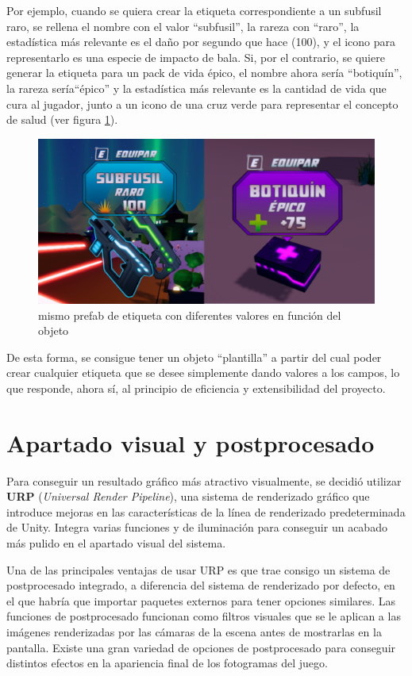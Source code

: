 Por ejemplo, cuando se quiera crear la etiqueta correspondiente a un subfusil raro, se rellena el nombre con el valor ``subfusil'', la rareza con ``raro'', la estadística más relevante es el daño por segundo que hace (100), y el icono para representarlo es una especie de impacto de bala. Si, por el contrario, se quiere generar la etiqueta para un pack de vida épico, el nombre ahora sería ``botiquín'', la rareza sería``épico'' y la estadística más relevante es la cantidad de vida que cura al jugador, junto a un icono de una cruz verde para representar el concepto de salud (ver figura \ref{fig:EjemplosEtiqueta}).
\begin{figure}[h]
	\centering
	\includegraphics[scale=0.45]{img/LabelExamples.png}
	\caption{mismo prefab de etiqueta con diferentes valores en función del objeto}
	\label{fig:EjemplosEtiqueta}
    \end{figure}
De esta forma, se consigue tener un objeto ``plantilla'' a partir del cual poder crear cualquier etiqueta que se desee simplemente dando valores a los campos, lo que responde, ahora sí, al principio de eficiencia y extensibilidad del proyecto.

\section{Apartado visual y postprocesado}
Para conseguir un resultado gráfico más atractivo visualmente, se decidió utilizar \textbf{URP} (\textit{Universal Render Pipeline}), una sistema de renderizado gráfico que introduce mejoras en las características de la línea de renderizado predeterminada de Unity. Integra varias funciones y de iluminación para conseguir un acabado más pulido en el apartado visual del sistema.

Una de las principales ventajas de usar URP es que trae consigo un sistema de postprocesado integrado, a diferencia del sistema de renderizado por defecto, en el que habría que importar paquetes externos para tener opciones similares.
Las funciones de postprocesado funcionan como filtros visuales que se le aplican a las imágenes renderizadas por las cámaras de la escena antes de mostrarlas en la pantalla. Existe una gran variedad de opciones de postprocesado para conseguir distintos efectos en la apariencia final de los fotogramas del juego.

